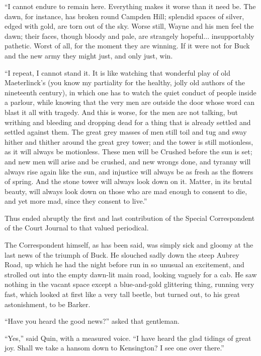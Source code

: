 \documentclass{book}
\begin{document}
“I cannot endure to remain here. Everything makes it worse than it need be. The dawn, for instance, has broken round Campden Hill; splendid spaces of silver, edged with gold, are torn out of the sky. Worse still, Wayne and his men feel the dawn; their faces, though bloody and pale, are strangely hopeful... insupportably pathetic. Worst of all, for the moment they are winning. If it were not for Buck and the new army they might just, and only just, win.

“I repeat, I cannot stand it. It is like watching that wonderful play of old Maeterlinck’s (you know my partiality for the healthy, jolly old authors of the nineteenth century), in which one has to watch the quiet conduct of people inside a parlour, while knowing that the very men are outside the door whose word can blast it all with tragedy. And this is worse, for the men are not talking, but writhing and bleeding and dropping dead for a thing that is already settled and settled against them. The great grey masses of men still toil and tug and sway hither and thither around the great grey tower; and the tower is still motionless, as it will always be motionless. These men will be Crushed before the sun is set; and new men will arise and be crushed, and new wrongs done, and tyranny will always rise again like the sun, and injustice will always be as fresh as the flowers of spring. And the stone tower will always look down on it. Matter, in its brutal beauty, will always look down on those who are mad enough to consent to die, and yet more mad, since they consent to live.”

Thus ended abruptly the first and last contribution of the Special Correspondent of the Court Journal to that valued periodical.

The Correspondent himself, as has been said, was simply sick and gloomy at the last news of the triumph of Buck. He slouched sadly down the steep Aubrey Road, up which he had the night before run in so unusual an excitement, and strolled out into the empty dawn-lit main road, looking vaguely for a cab. He saw nothing in the vacant space except a blue-and-gold glittering thing, running very fast, which looked at first like a very tall beetle, but turned out, to his great astonishment, to be Barker.

“Have you heard the good news?” asked that gentleman.

“Yes,” said Quin, with a measured voice. “I have heard the glad tidings of great joy. Shall we take a hansom down to Kensington? I see one over there.”
\end{document}
